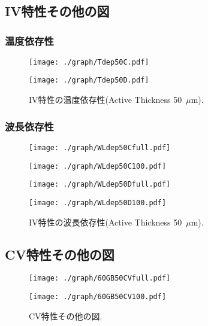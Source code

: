\chapter{}
\section{IV特性その他の図}
\subsection{温度依存性}
\label{T}
\begin{figure}[H]
\begin{minipage}{0.5\hsize}
	\centering
	\texttt{[image: ./graph/Tdep50C.pdf]}
\end{minipage}
\begin{minipage}{0.5\hsize}
	\centering
	\texttt{[image: ./graph/Tdep50D.pdf]}
\end{minipage}
 	\caption{IV特性の温度依存性(Active Thickness 50~$\mu$m).}
\end{figure}

\subsection{波長依存性}
\label{W}
\begin{figure}[H]
\begin{minipage}{0.55\hsize}
	\centering
	\texttt{[image: ./graph/WLdep50Cfull.pdf]}
\end{minipage}
\begin{minipage}{0.45\hsize}
	\centering
	\texttt{[image: ./graph/WLdep50C100.pdf]}
\end{minipage}
\begin{minipage}{0.55\hsize}
	\centering
	\texttt{[image: ./graph/WLdep50Dfull.pdf]}
\end{minipage}
\begin{minipage}{0.45\hsize}
	\centering
	\texttt{[image: ./graph/WLdep50D100.pdf]}
\end{minipage}
 	\caption{IV特性の波長依存性(Active Thickness 50~$\mu$m).}
\end{figure}

\section{CV特性その他の図}
\label{CV}
\begin{figure}[H]
\begin{minipage}{0.5\hsize}
	\centering
	\texttt{[image: ./graph/60GB50CVfull.pdf]}
\end{minipage}
\begin{minipage}{0.5\hsize}
	\centering
	\texttt{[image: ./graph/60GB50CV100.pdf]}
\end{minipage}
 	\caption{CV特性その他の図.}
\end{figure}

